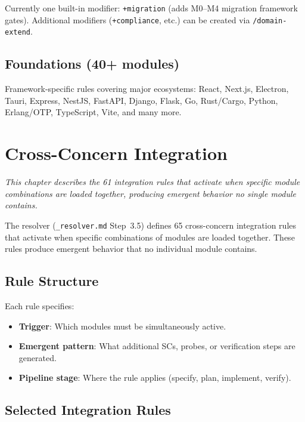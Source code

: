 \documentclass[11pt,a4paper,openright,twoside]{report}
\newcommand{\cmd}[1]{\texttt{/#1}}
\newcommand{\file}[1]{\texttt{#1}}
\begin{document}
Currently one built-in modifier: \texttt{+migration} (adds M0--M4 migration framework gates). Additional modifiers (\texttt{+compliance}, etc.) can be created via \cmd{domain-extend}.

\section{Foundations (40+ modules)}

Framework-specific rules covering major ecosystems: React, Next.js, Electron, Tauri, Express, NestJS, FastAPI, Django, Flask, Go, Rust/Cargo, Python, Erlang/OTP, TypeScript, Vite, and many more.


\chapter{Cross-Concern Integration}
\label{ch:cross-concern}

\textit{This chapter describes the 61 integration rules that activate when specific module combinations are loaded together, producing emergent behavior no single module contains.}

The resolver (\file{\_resolver.md} Step~3.5) defines 65 cross-concern integration rules that activate when specific combinations of modules are loaded together. These rules produce emergent behavior that no individual module contains.

\section{Rule Structure}

Each rule specifies:
\begin{itemize}
  \item \textbf{Trigger}: Which modules must be simultaneously active.
  \item \textbf{Emergent pattern}: What additional SCs, probes, or verification steps are generated.
  \item \textbf{Pipeline stage}: Where the rule applies (specify, plan, implement, verify).
\end{itemize}

\section{Selected Integration Rules}
\end{document}
